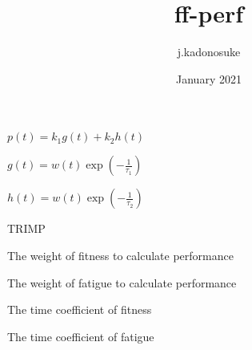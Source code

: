 \documentclass{article}
\title{ff-perf}
\author{j.kadonosuke }
\date{January 2021}
\begin{document}
\maketitle



\begin{description}[leftmargin=!,labelwidth=\widthof{\bfseries The longest label}]
  \item [Performance] $p(t) = k_1g(t) + k_2h(t)$
  \item [Fitness] $g(t) = w(t)\exp{\left(-\frac{1}{\tau_1}\right)}$
  \item [Fatigue] $h(t) = w(t)\exp{\left(-\frac{1}{\tau_2}\right)}$
  \item [$w(t)$] TRIMP
  \item [$k_1$] The weight of fitness to calculate performance
  \item [$k_2$] The weight of fatigue to calculate performance
  \item [$\tau_1$] The time coefficient of fitness
  \item [$\tau_2$] The time coefficient of fatigue
\end{description}
\end{document}
